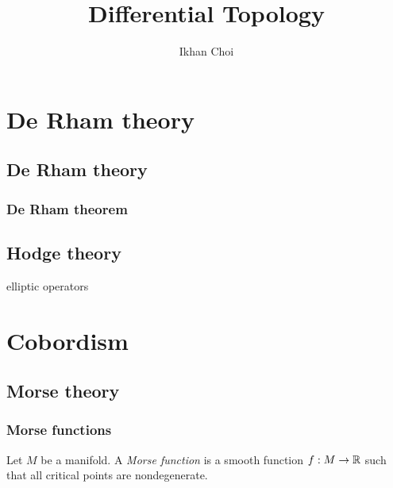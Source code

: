 \documentclass{../../large}
\begin{document}
\title{Differential Topology}
\author{Ikhan Choi}
\maketitle
\tableofcontents


\part{De Rham theory}
\chapter{De Rham theory}
\section{De Rham theorem}

\chapter{Hodge theory}
elliptic operators


\part{Cobordism}
\chapter{Morse theory}
\section{Morse functions}

\begin{defn}
Let $M$ be a manifold.
A \emph{Morse function} is a smooth function $f:M\to\mathbb{R}$ such that all critical points are nondegenerate.
\end{defn}
\end{document}
